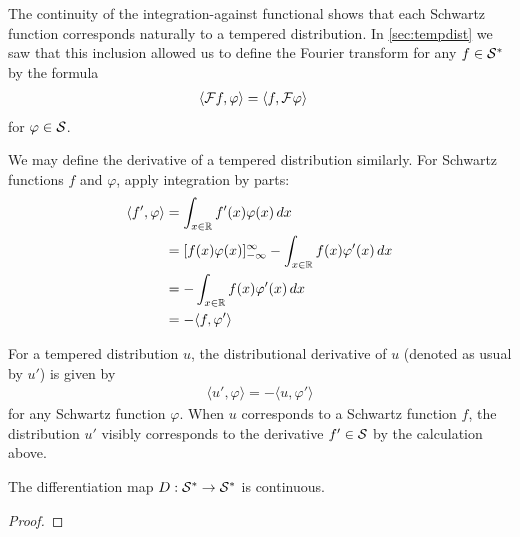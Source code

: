   The continuity of the integration-against functional shows that each Schwartz function corresponds naturally to a tempered distribution.
  In \cref{sec:tempdist} we saw that this inclusion allowed us to define the Fourier transform for any $f\in\S^*$ by the formula
  \begin{align*}
    \langle\F f, \varphi\rangle &= \langle f, \F\varphi\rangle
  \end{align*}
  for $\varphi\in\S$.
  
  We may define the derivative of a tempered distribution similarly.
  For Schwartz functions $f$ and $\varphi$, apply integration by parts:
  \begin{align*}
    \langle f', \varphi\rangle
    &= \int_{x\in\R} f'(x)\varphi(x)\,dx
    \\&= [f(x)\varphi(x)]_{-\infty}^\infty -\int_{x\in\R} f(x)\varphi'(x)\,dx
    \\&= -\int_{x\in\R} f(x)\varphi'(x)\,dx
    \\&= -\langle f,\varphi'\rangle
  \end{align*}
  \begin{defn}
    For a tempered distribution $u$, the distributional derivative of $u$ (denoted as usual by $u'$) is given by
    \begin{align*}
      \langle u', \varphi\rangle = -\langle u, \varphi'\rangle
    \end{align*}
    for any Schwartz function $\varphi$.
    When $u$ corresponds to a Schwartz function $f$, the distribution $u'$ visibly corresponds to the derivative $f'\in\S$ by the calculation above. 
  \end{defn}

  \begin{claim}
    The differentiation map $D:\S^*\rightarrow\S^*$ is continuous.
  \end{claim}
  \begin{proof}
    
  \end{proof}



